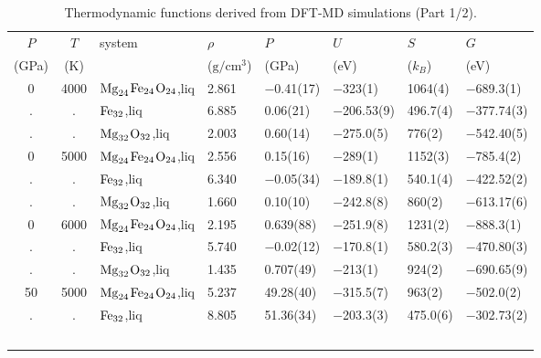 \begin{table}[!h]
\centering

\caption{Thermodynamic functions derived from DFT-MD simulations (Part 1/2).
\label{tab:results}}
\begin{adjustbox}{max width=\textwidth}
\begin{tabular}{ccllllll}
    \hline
 {$P$} & {$T$} & {system} &  {$\rho$} & 
 {$P$} & {$U$} & {$S$} &  {$G$}  \\
 {(GPa)} & {(K)} & &  {($\mathrm{g}/\mathrm{cm}^3$)} 
   & {(GPa)} & {(eV)} & {($k_B$)} & {(eV)} \\
   \hline
             0 &   4000 &  $\rm{Mg}_{24}$$\rm{Fe}_{24}$$\rm{O}_{24}$,liq &   2.861 &   $-$0.41(17) &     $-$323(1) &    1064(4) &     $-$689.3(1) \\
             . &      . &                             $\rm{Fe}_{32}$,liq &   6.885 &    0.06(21) &  $-$206.53(9) &   496.7(4) &    $-$377.74(3) \\
             . &      . &                $\rm{Mg}_{32}$$\rm{O}_{32}$,liq &   2.003 &    0.60(14) &   $-$275.0(5) &     776(2) &    $-$542.40(5) \\
             0 &   5000 &  $\rm{Mg}_{24}$$\rm{Fe}_{24}$$\rm{O}_{24}$,liq &   2.556 &    0.15(16) &     $-$289(1) &    1152(3) &     $-$785.4(2) \\
             . &      . &                             $\rm{Fe}_{32}$,liq &   6.340 &   $-$0.05(34) &   $-$189.8(1) &   540.1(4) &    $-$422.52(2) \\
             . &      . &                $\rm{Mg}_{32}$$\rm{O}_{32}$,liq &   1.660 &    0.10(10) &   $-$242.8(8) &     860(2) &    $-$613.17(6) \\
             0 &   6000 &  $\rm{Mg}_{24}$$\rm{Fe}_{24}$$\rm{O}_{24}$,liq &   2.195 &   0.639(88) &   $-$251.9(8) &    1231(2) &     $-$888.3(1) \\
             . &      . &                             $\rm{Fe}_{32}$,liq &   5.740 &   $-$0.02(12) &   $-$170.8(1) &   580.2(3) &    $-$470.80(3) \\
             . &      . &                $\rm{Mg}_{32}$$\rm{O}_{32}$,liq &   1.435 &   0.707(49) &     $-$213(1) &     924(2) &    $-$690.65(9) \\
            50 &   5000 &  $\rm{Mg}_{24}$$\rm{Fe}_{24}$$\rm{O}_{24}$,liq &   5.237 &   49.28(40) &   $-$315.5(7) &     963(2) &     $-$502.0(2) \\
             . &      . &                             $\rm{Fe}_{32}$,liq &   8.805 &   51.36(34) &   $-$203.3(3) &   475.0(6) &    $-$302.73(2) \\
$$
\end{tabular}
\end{adjustbox}
\end{table}
